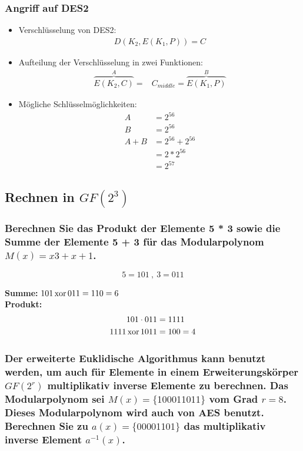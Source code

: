  \subsubsection{Angriff auf DES2}
 \begin{itemize}
     \item Verschlüsselung von DES2:
     \begin{align}
         D( K_2, E( K_1, P )) = C
     \end{align}

     \item Aufteilung der Verschlüsselung in zwei Funktionen:
     \begin{align}
         \overbrace{E(K_2, C)}^{A} = &C_{middle} = \overbrace{E(K_1, P)}^{B}
     \end{align}

     \item Mögliche Schlüsselmöglichkeiten:
     \begin{align*}
         A &= 2^{56}\\
         B &= 2^{56}\\
         A + B &= 2^{56} + 2^{56}\\
         &= 2 * 2^{56}\\
         &= 2^{57}
     \end{align*}

 \end{itemize}



\subsection{Rechnen in $GF(2^3)$}
\subsubsection{Berechnen Sie das Produkt der Elemente {5} * {3} sowie die Summe der
Elemente {5} + {3} für das Modularpolynom $M(x)=x3+x+1$.}

\[ 5 = 101 ~,~ 3 = 011 \]

\textbf{Summe:}   	$101 \operatorname*{xor} 011 = 110 = 6$ \\
\textbf{Produkt:}   \begin{align}
						101 \cdot 011 &= 1111  \\
                       1111 \operatorname*{xor} 1011 &= 100 = 4
					\end{align} 
					
\subsubsection{Der erweiterte Euklidische Algorithmus kann benutzt werden, um auch für
Elemente in einem Erweiterungskörper $GF(2^r)$ multiplikativ inverse Elemente
zu berechnen. Das Modularpolynom sei $M(x)=\{100011011\}$ vom Grad $r=8$.
Dieses Modularpolynom wird auch von AES benutzt. Berechnen Sie zu
$a(x)=\{00001101\}$ das multiplikativ inverse Element $a^{-1}(x)$.}

